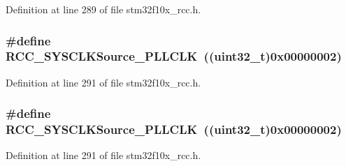 Definition at line 289 of file stm32f10x\+\_\+rcc.\+h.

\subsubsection[{\texorpdfstring{R\+C\+C\+\_\+\+S\+Y\+S\+C\+L\+K\+Source\+\_\+\+P\+L\+L\+C\+LK}{RCC_SYSCLKSource_PLLCLK}}]{\setlength{\rightskip}{0pt plus 5cm}\#define R\+C\+C\+\_\+\+S\+Y\+S\+C\+L\+K\+Source\+\_\+\+P\+L\+L\+C\+LK~(({\bf uint32\+\_\+t})0x00000002)}\hypertarget{group___system__clock__source_ga9301b7a07a7cb8c2c6ed87b619c1c966}{}\label{group___system__clock__source_ga9301b7a07a7cb8c2c6ed87b619c1c966}


Definition at line 291 of file stm32f10x\+\_\+rcc.\+h.

\subsubsection[{\texorpdfstring{R\+C\+C\+\_\+\+S\+Y\+S\+C\+L\+K\+Source\+\_\+\+P\+L\+L\+C\+LK}{RCC_SYSCLKSource_PLLCLK}}]{\setlength{\rightskip}{0pt plus 5cm}\#define R\+C\+C\+\_\+\+S\+Y\+S\+C\+L\+K\+Source\+\_\+\+P\+L\+L\+C\+LK~(({\bf uint32\+\_\+t})0x00000002)}\hypertarget{group___system__clock__source_ga9301b7a07a7cb8c2c6ed87b619c1c966}{}\label{group___system__clock__source_ga9301b7a07a7cb8c2c6ed87b619c1c966}


Definition at line 291 of file stm32f10x\+\_\+rcc.\+h.

